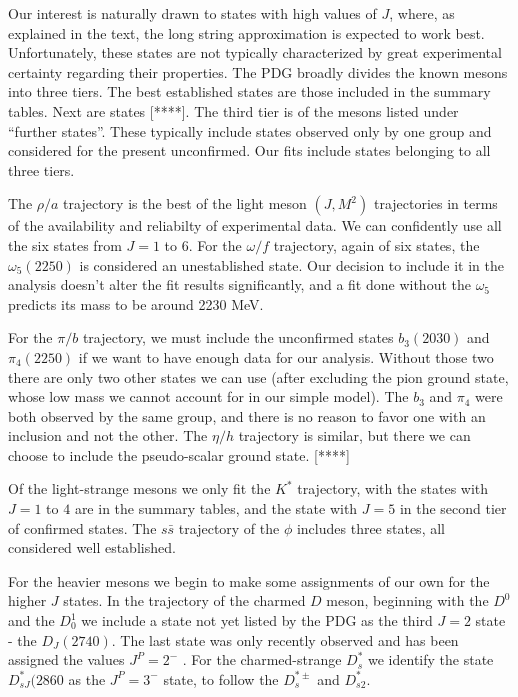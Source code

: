 \documentclass[11pt,a4]{article}
\newcommand{\ssb}{s\bar{s}}
\begin{document}
Our interest is naturally drawn to states with high values of \(J\), where, as explained in the text, the long string approximation is expected to work best. Unfortunately, these states are not typically characterized by great experimental certainty regarding their properties. The PDG broadly divides the known mesons into three tiers. The best established states are those included in the summary tables. Next are states [****]. The third tier is of the mesons listed under ``further states''. These typically include states observed only by one group and considered for the present unconfirmed. Our fits include states belonging to all three tiers.

The \(\rho/a\) trajectory is the best of the light meson \((J,M^2)\) trajectories in terms of the availability and reliabilty of experimental data. We can confidently use all the six states from \(J = 1\) to \(6\). For the \(\omega/f\) trajectory, again of six states, the \(\omega_5(2250)\) is considered an unestablished state. Our decision to include it in the analysis doesn't alter the fit results significantly, and a fit done without the \(\omega_5\) predicts its mass to be around 2230 MeV.

For the \(\pi/b\) trajectory, we must include the unconfirmed states \(b_3(2030)\) and \(\pi_4(2250)\) if we want to have enough data for our analysis. Without those two there are only two other states we can use (after excluding the pion ground state, whose low mass we cannot account for in our simple model). The \(b_3\) and \(\pi_4\) were both observed by the same group, and there is no reason to favor one with an inclusion and not the other. The \(\eta/h\) trajectory is similar, but there we can choose to include the pseudo-scalar ground state. [****]

Of the light-strange mesons we only fit the \(K^*\) trajectory, with the states with \(J = 1\) to \(4\) are in the summary tables, and the state with \(J = 5\) in the second tier of confirmed states. The \(\ssb\) trajectory of the \(\phi\) includes three states, all considered well established.

For the heavier mesons we begin to make some assignments of our own for the higher \(J\) states. In the trajectory of the charmed \(D\) meson, beginning with the \(D^0\) and the \(D^1_0\) we include a state not yet listed by the PDG as the third \(J = 2\) state - the \(D_J(2740)\). The last state was only recently observed and has been assigned the values \(J^P = 2^-\) \cite{Aaij:2013sza}\cite{Wang:2013tka}. For the charmed-strange \(D^*_s\) we identify the state \(D^*_{sJ}(2860\) as the \(J^P = 3^-\) state, to follow the \(D^{*\pm}_s\) and \(D^*_{s2}\).
\end{document}

